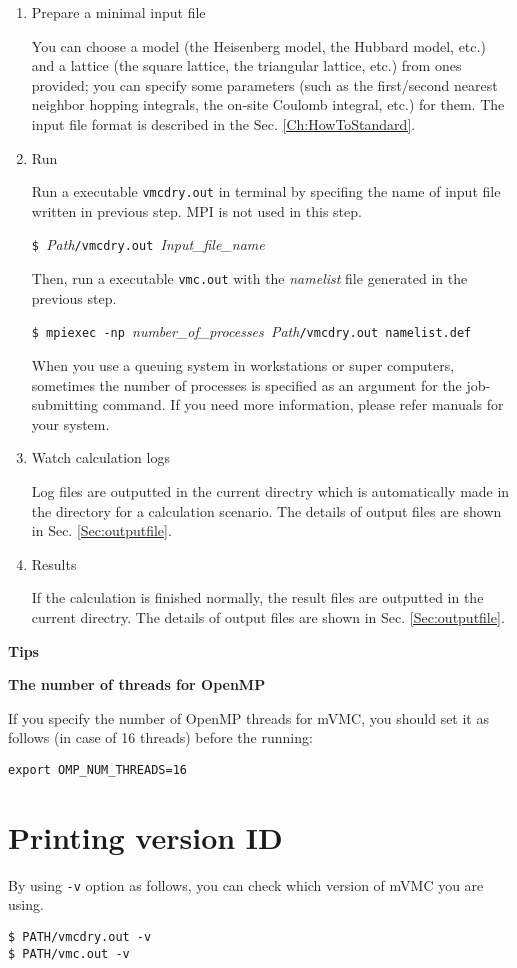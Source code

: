 \begin{enumerate}

\item  Prepare a minimal input file

You can choose a model (the Heisenberg model, the Hubbard model, etc.) and 
a lattice (the square lattice, the triangular lattice, etc.) from ones provided;
you can specify some parameters (such as the first/second nearest neighbor hopping integrals,
the on-site Coulomb integral, etc.) for them.
The input file format is described in the Sec. \ref{Ch:HowToStandard}.

\item  Run

Run a executable \verb|vmcdry.out| in terminal by specifing
the name of input file written in previous step.
MPI is not used in this step.

\verb|$ |\textit{Path}\verb|/vmcdry.out |\textit{Input\_file\_name}

Then, run a executable \verb|vmc.out| with 
the {\it namelist} file generated in the previous step.

\verb|$ mpiexec -np |\textit{number\_of\_processes}\verb| |\textit{Path}\verb|/vmcdry.out namelist.def|

When you use a queuing system in workstations or super computers, 
sometimes the number of processes is specified as an argument for the job-submitting command.
If you need more information, please refer manuals for your system. 

\item Watch calculation logs

Log files are outputted in the current directry which is automatically made in the directory for a calculation scenario.
The details of output files are shown in Sec. \ref{Sec:outputfile}.

\item Results

  If the calculation is finished normally, the result files are outputted in  the current directry.
  The details of output files are shown in Sec. \ref{Sec:outputfile}.

\end{enumerate}

\begin{screen}
\Large 
{\bf Tips}
\normalsize

{\bf The number of threads for OpenMP}

If you specify the number of OpenMP threads for mVMC,
you should set it as follows (in case of 16 threads) before the running:
\begin{verbatim}
export OMP_NUM_THREADS=16
\end{verbatim}

\end{screen}

\section{Printing version ID}

By using \verb|-v| option as follows, 
you can check which version of mVMC you are using.

\begin{verbatim}
$ PATH/vmcdry.out -v
$ PATH/vmc.out -v
\end{verbatim}
